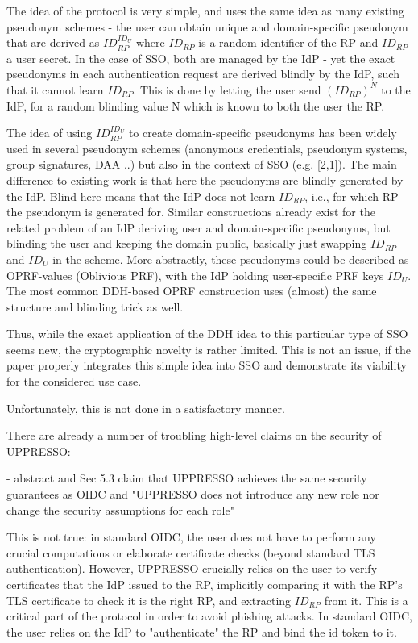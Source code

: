 \documentclass[letterpaper,onecolumn,10pt]{article}
\begin{document}
The idea of the protocol is very simple, and uses the same idea as many existing pseudonym schemes - the user can obtain unique and domain-specific pseudonym that are derived as $ID_{RP} ^ {ID_U}$ where $ID_{RP}$ is a random identifier of the RP and $ID_{RP}$ a user secret. In the case of SSO, both are managed by the IdP - yet the exact pseudonyms in each authentication request are derived blindly by the IdP, such that it cannot learn $ID_{RP}$. This is done by letting the user send $(ID_{RP})^N$ to the IdP, for a random blinding value N which is known to both the user the RP.

The idea of using $ID_{RP}^{ID_U}$ to create domain-specific pseudonyms has been widely used in several pseudonym schemes (anonymous credentials, pseudonym systems, group signatures, DAA ..) but also in the context of SSO (e.g. [2,1]). The main difference to existing work is that here the pseudonyms are blindly generated by the IdP. Blind here means that the IdP does not learn $ID_{RP}$, i.e., for which RP the pseudonym is generated for. Similar constructions already exist for the related problem of an IdP deriving user and domain-specific pseudonyms, but blinding the user and keeping the domain public, basically just swapping $ID_{RP}$ and $ID_U$ in the scheme. More abstractly, these pseudonyms could be described as OPRF-values (Oblivious PRF), with the IdP holding user-specific PRF keys $ID_U$. The most common DDH-based OPRF construction uses (almost) the same structure and blinding trick as well.

Thus, while the exact application of the DDH idea to this particular type of SSO seems new, the cryptographic novelty is rather limited. This is not an issue, if the paper properly integrates this simple idea into SSO and demonstrate its viability for the considered use case. 

Unfortunately, this is not done in a satisfactory manner.

There are already a number of troubling high-level claims on the security of UPPRESSO:

- abstract and Sec 5.3 claim that UPPRESSO achieves the same security guarantees as OIDC and "UPPRESSO does not introduce any new role nor change the security assumptions for each role"

This is not true: in standard OIDC, the user does not have to perform any crucial computations or elaborate certificate checks (beyond standard TLS authentication). However, UPPRESSO crucially relies on the user to verify certificates that the IdP issued to the RP, implicitly comparing it with the RP's TLS certificate to check it is the right RP, and extracting $ID_{RP}$ from it. This is a critical part of the protocol in order to avoid phishing attacks. In standard OIDC, the user relies on the IdP to "authenticate" the RP and bind the id token to it. 
\end{document}
